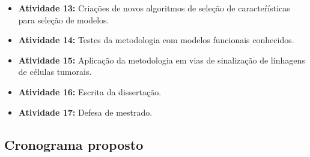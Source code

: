 \documentclass[12pt]{article}
\begin{document}
\begin{itemize}
        {\em featsel} que deve utilizar como base o critério AIC para 
        avaliar modelos.
    \item{\bf Atividade 13:} Criações de novos algoritmos de seleção de
        caracteŕísticas para seleção de modelos.
    \item{\bf Atividade 14:} Testes da metodologia com modelos 
        funcionais conhecidos.
    \item{\bf Atividade 15:} Aplicação da metodologia em vias de 
        sinalização de linhagens de células tumorais.
    \item{\bf Atividade 16:} Escrita da dissertação.
    \item{\bf Atividade 17:} Defesa de mestrado.
\end{itemize}

\subsection{Cronograma proposto}

\end{document}
